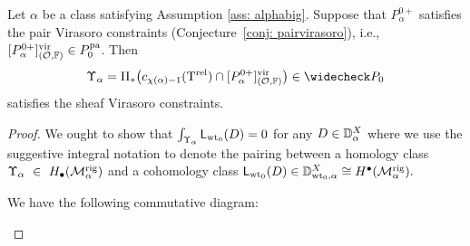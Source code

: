 \documentclass[a4paper, 12pt]{amsart}
\begin{document}
\begin{theorem}\label{lem: projectivebundle}
Let $\alpha$ be a class satisfying Assumption \ref{ass: alphabig}. Suppose that $P^{0+}_\alpha$ satisfies the pair Virasoro constraints (Conjecture~\ref{conj: pairvirasoro}), i.e., $[P^{0+}_\alpha]^{\mathrm{vir}}_{({\mathcal O}, {\mathbb{F}})}\in P^{\mathop{\rm pa}\nolimits}_{0}$. Then 
\[\Upsilon_\alpha=\Pi_\ast\big(c_{\chi(\alpha)-1}(\T^{\rel})\cap [P^{0+}_\alpha]^\vir_{(\CO, \BF)}\big)\in \widecheck P_0\]
satisfies the sheaf Virasoro constraints.
\end{theorem}


\begin{proof}
We ought to show that $\int_{\Upsilon_\alpha}\mathsf{L}_{{\mathrm{wt}_0}}(D)=0$ for any $D\in {\mathbb{D}}^X_{\alpha}$ where we use the suggestive integral notation to denote the pairing between a homology class $\Upsilon_\alpha~\in~H_\bullet(\mathcal{M}^{\mathrm{rig}}_\alpha)$ and a cohomology class $\mathsf{L}_{{\mathrm{wt}_0}}(D)\in {\mathbb{D}}^X_{{\mathrm{wt}_0}, \alpha}\cong H^\bullet(\mathcal{M}^{\mathrm{rig}}_\alpha).$ 

We have the following commutative diagram:
\begin{center}
\end{center}







\end{proof}
\end{document}
